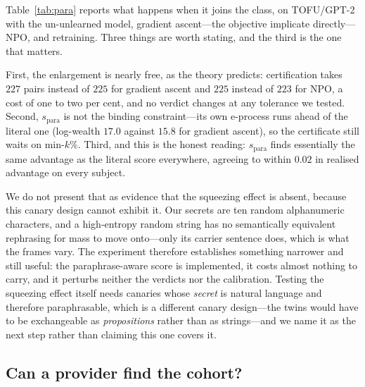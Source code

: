 Table~\ref{tab:para} reports what happens when it joins the class, on TOFU/GPT-2 with
the un-unlearned model, gradient ascent---the objective \citet{li2026beliefs}
implicate directly---NPO, and retraining. Three things are worth stating, and the
third is the one that matters.

First, the enlargement is nearly free, as the theory predicts: certification takes
$227$ pairs instead of $225$ for gradient ascent and $225$ instead of $223$ for NPO,
a cost of one to two per cent, and no verdict changes at any tolerance we tested.
Second, $s_{\mathrm{para}}$ is not the binding constraint---its own e-process runs
ahead of the literal one (log-wealth $17.0$ against $15.8$ for gradient ascent), so
the certificate still waits on min-$k\%$. Third, and this is the honest reading:
$s_{\mathrm{para}}$ finds essentially the same advantage as the literal score
everywhere, agreeing to within $0.02$ in realised advantage on every subject.

We do not present that as evidence that the squeezing effect is absent, because this
canary design cannot exhibit it. Our secrets are ten random alphanumeric characters,
and a high-entropy random string has no semantically equivalent rephrasing for mass to
move onto---only its carrier sentence does, which is what the frames vary. The
experiment therefore establishes something narrower and still useful: the
paraphrase-aware score is implemented, it costs almost nothing to carry, and it
perturbs neither the verdicts nor the calibration. Testing the squeezing effect itself
needs canaries whose \emph{secret} is natural language and therefore paraphrasable,
which is a different canary design---the twins would have to be exchangeable as
\emph{propositions} rather than as strings---and we name it as the next step rather
than claiming this one covers it.

\begin{table}[t]
\centering\small
\caption{A paraphrase-aware score added to the declared class, TOFU/GPT-2, $384$
pairs, cohort target. $\hat\Delta$ is the realised cohort advantage under each score;
``pairs to certify'' is the stopping time under $\F$ and under
$\F \cup \{s_{\mathrm{para}}\}$. Enlarging the class costs power and no validity, and
here the power costs one to two per cent.}
\label{tab:para}

\end{table}

\subsection{Can a provider find the cohort?}\label{sec:exp-detect}

